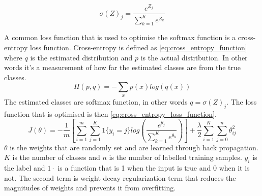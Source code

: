 \begin{equation}
\label{eq:softmax_activation_function}
\sigma(Z)_{j} = \frac{e^{Z_j}}{\sum_{k=1}^{K}e^{Z_k}}
\end{equation}

A common loss function that is used to optimise the softmax function is a cross-entropy loss function. Cross-entropy is defined as \autoref{eq:cross_entropy_function} where $q$ is the estimated distribution and $p$ is the actual distribution. In other words it's a measurement of how far the estimated classes are from the true classes.
\begin{equation}
\label{eq:cross_entropy_function}
H(p,q) = -\sum_{x}p(x)log(q(x))
\end{equation}
The estimated classes are softmax function, in other words $q = \sigma(Z)_{j} $. The loss function that is optimised is then \autoref{eq:cross_entropy_loss_function}.
\begin{equation}
\label{eq:cross_entropy_loss_function}
J(\theta) = -\frac{1}{m}\left[ \sum_{i=1}^{m}\sum_{j=1}^{K} 1\{y_i=j\}  log\left( \frac{e^{\theta_j}}{\sum_{k=1}^{K}e^{\theta_k}} \right)\right] + \frac{\lambda}{2} \sum_{i=1}^{K} \sum_{j=0}^{n} \theta_{ij}^{2}
\end{equation}
$\theta$ is the weights that are randomly set and are learned through back propagation. $K$ is the number of classes and $n$ is the number of labelled training samples. $y_i$ is the label and $1{\cdot}$ is a function that is 1 when the input is true and 0 when it is not. The second term is weight decay regularization term that reduces the magnitudes of weights and prevents it from overfitting.


